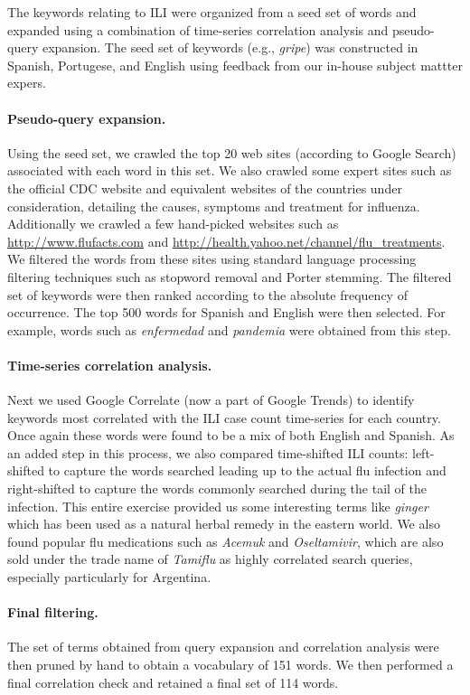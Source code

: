 
The keywords relating to ILI were
organized from a seed set of words and expanded using a combination of 
time-series correlation analysis and pseudo-query expansion.
The seed set of keywords (e.g., {\em gripe}) was constructed in Spanish, 
Portugese, and English using feedback from our 
in-house subject mattter expers.

\paragraph{Pseudo-query expansion.}
Using the seed set, we crawled
the top 20 web sites (according to Google Search) associated with each
word in this set. We also crawled some expert sites such as the official CDC
website and equivalent websites of the countries under consideration, detailing the
causes, symptoms and treatment for influenza.
Additionally we crawled a few hand-picked websites such as
\url{http://www.flufacts.com} and \url{http://health.yahoo.net/channel/flu\_treatments}.
We filtered the words from these sites using standard language
processing filtering techniques such as stopword removal and Porter
stemming. The filtered set of keywords were then ranked according to 
the absolute frequency of occurrence. The top 500 words for Spanish and
English were then selected. For example, words such as {\em enfermedad}
and {\em pandemia} were obtained from this step.

\paragraph{Time-series correlation analysis.}
Next we used Google Correlate (now a part of Google Trends) to identify keywords
most correlated with
the ILI case count time-series for each country.
Once again these words were found to be a mix of 
 both English and Spanish. As an added step in this process, we also
 compared time-shifted ILI counts: left-shifted  to capture the words searched leading up to 
 the actual flu infection and right-shifted to capture the words
commonly searched during the tail of the infection. 
This entire exercise provided us some interesting terms like {\em ginger} which has been used as
a natural herbal remedy in the eastern world. We also found popular flu medications
such as {\em Acemuk} and  {\em Oseltamivir}, which are also sold under the trade name of
{\em Tamiflu} as highly correlated search queries, especially particularly for
Argentina.

\paragraph{Final filtering.}
The set of terms obtained from query expansion and correlation analysis were then 
pruned by hand to obtain a vocabulary of 151 words. We then performed a final
correlation check and retained a final set of 114 words.

